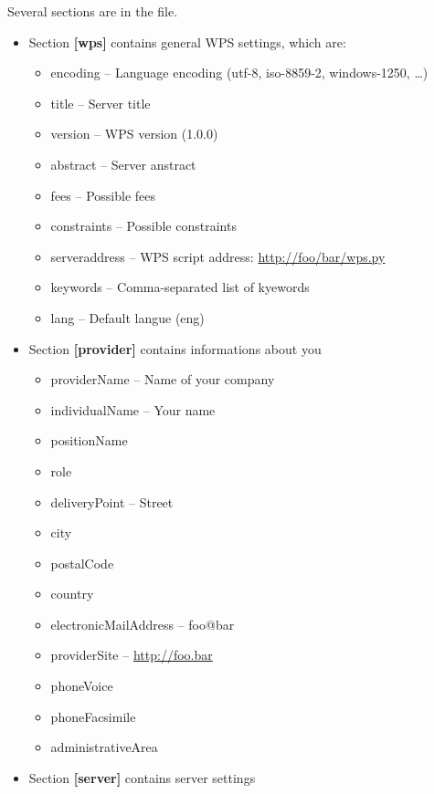 \documentclass[a4paper,11pt]{article}
\begin{document}
Several sections are in the file. 
\begin{itemize}
    \item Section \textbf{[wps]} contains general WPS settings, which are:
        \begin{itemize}
            \item encoding -- Language encoding (utf-8, iso-8859-2, windows-1250, \dots)
            \item title -- Server title 
            \item version -- WPS version (1.0.0)
            \item abstract -- Server anstract
            \item fees -- Possible fees
            \item constraints -- Possible constraints
            \item serveraddress -- WPS script address: \url{http://foo/bar/wps.py}
            \item keywords -- Comma-separated list of kyewords
            \item lang -- Default langue (eng)
        \end{itemize}
    \item Section \textbf{[provider]} contains informations about you
        \begin{itemize}
            \item providerName -- Name of your company
            \item individualName -- Your name
            \item positionName
            \item role 
            \item deliveryPoint -- Street
            \item city
            \item postalCode
            \item country
            \item electronicMailAddress -- foo@bar
            \item providerSite -- \url{http://foo.bar}
            \item phoneVoice
            \item phoneFacsimile
            \item administrativeArea
        \end{itemize}
    \item Section \textbf{[server]} contains server settings
        \begin{itemize}

\end{itemize}
\end{itemize}
\end{document}
